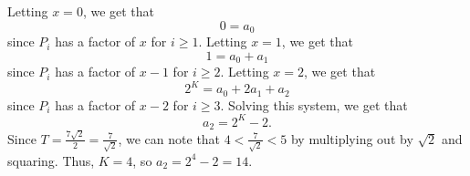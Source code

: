 Letting $x=0$, we get that \[0=a_0\] since $P_i$ has a factor of $x$ for $i\geq1$. Letting $x=1$, we get that \[1=a_0+a_1\] since $P_i$ has a factor of $x-1$ for $i\geq2$. Letting $x=2$, we get that \[2^K=a_0+2a_1+a_2\] since $P_i$ has a factor of $x-2$ for $i\geq3$. Solving this system, we get that \[a_2=2^K-2.\] Since $T=\frac{7\sqrt{2}}{2}=\frac{7}{\sqrt{2}}$, we can note that $4<\frac{7}{\sqrt{2}}<5$ by multiplying out by $\sqrt{2}$ and squaring. Thus, $K=4$, so $a_2=2^4-2=\boxed{14}$.